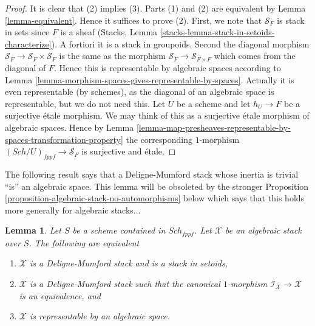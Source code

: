 \documentclass{stacks-project}
\theoremstyle{plain}
\newtheorem{lemma}[subsection]{Lemma}
\theoremstyle{definition}
\theoremstyle{remark}
\numberwithin{equation}{subsection}
\def\Sch{\mathit{Sch}}
\begin{document}
\begin{proof}
It is clear that (2) implies (3).
Parts (1) and (2) are equivalent by Lemma \ref{lemma-equivalent}.
Hence it suffices to prove (2).
First, we note that $\mathcal{S}_F$ is stack in sets since
$F$ is a sheaf (Stacks, Lemma
\ref{stacks-lemma-stack-in-setoids-characterize}).
A fortiori it is a stack in groupoids. Second the diagonal
morphism $\mathcal{S}_F \to \mathcal{S}_F  \times \mathcal{S}_F$
is the same as the morphism $\mathcal{S}_F \to \mathcal{S}_{F \times F}$
which comes from the diagonal of $F$. Hence this is representable
by algebraic spaces according to
Lemma \ref{lemma-morphism-spaces-gives-representable-by-spaces}.
Actually it is even representable (by schemes), as the diagonal of
an algebraic space is representable, but we do not need this.
Let $U$ be a scheme and let $h_U \to F$ be a surjective \'etale morphism.
We may think of this as a surjective \'etale morphism of algebraic spaces.
Hence by
Lemma
\ref{lemma-map-presheaves-representable-by-spaces-transformation-property}
the corresponding $1$-morphism $(\Sch/U)_{fppf} \to \mathcal{S}_F$
is surjective and \'etale.
\end{proof}

\noindent
The following result says that a Deligne-Mumford stack whose inertia
is trivial ``is'' an algebraic space. This lemma will be obsoleted by
the stronger
Proposition \ref{proposition-algebraic-stack-no-automorphisms}
below which says that this holds more generally for algebraic stacks...

\begin{lemma}
\label{lemma-algebraic-stack-no-automorphisms}
Let $S$ be a scheme contained in $\Sch_{fppf}$.
Let $\mathcal{X}$ be an algebraic stack over $S$.
The following are equivalent
\begin{enumerate}
\item $\mathcal{X}$ is a Deligne-Mumford stack and is a stack in setoids,
\item $\mathcal{X}$ is a Deligne-Mumford stack such that the
canonical $1$-morphism $\mathcal{I}_\mathcal{X} \to \mathcal{X}$
is an equivalence, and
\item $\mathcal{X}$ is representable by an algebraic space.
\end{enumerate}
\end{lemma}
\end{document}
